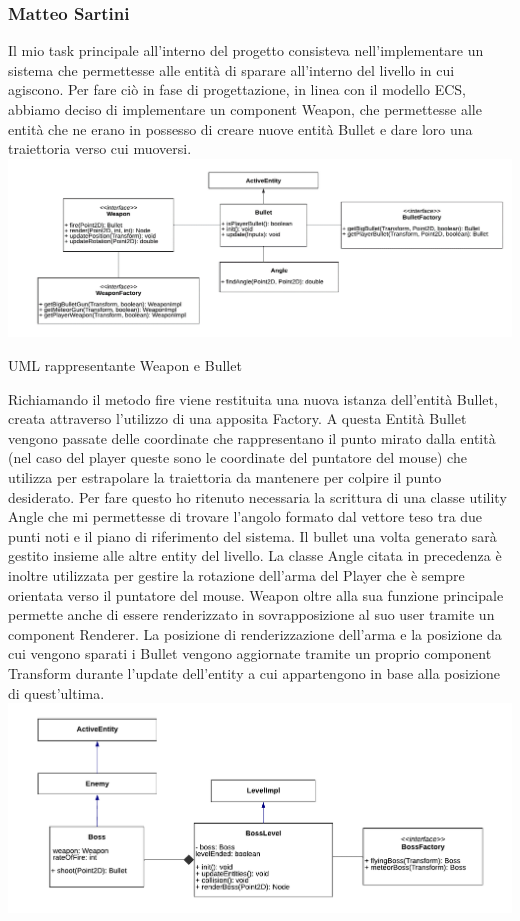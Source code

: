\documentclass{article}
\begin{document}
\subsubsection{Matteo Sartini}
Il mio task principale all’interno del progetto consisteva nell’implementare un sistema che permettesse alle entità di sparare all’interno del livello in cui agiscono.
Per fare ciò in fase di progettazione, in linea con il modello ECS, abbiamo deciso di implementare un component Weapon, che permettesse alle entità che ne erano in possesso di creare nuove entità Bullet e dare loro una traiettoria verso cui muoversi.
\includegraphics[width=1\textwidth]{UMLWeapon.png}
    \caption{UML rappresentante Weapon e Bullet}
    \label{fig:schgen}
Richiamando il metodo fire viene restituita una nuova istanza dell’entità Bullet, creata attraverso l’utilizzo di una apposita Factory. A questa Entità Bullet vengono passate delle coordinate che rappresentano il punto mirato dalla entità (nel caso del player queste sono le coordinate del puntatore del mouse) che utilizza per estrapolare la traiettoria da mantenere per colpire il punto desiderato. Per fare questo ho ritenuto necessaria la scrittura di una classe utility Angle che mi permettesse di trovare l’angolo formato dal vettore teso tra due punti noti e il piano di riferimento del sistema. Il bullet una volta generato sarà gestito insieme alle altre entity del livello.
La classe Angle citata in precedenza è inoltre utilizzata per gestire la rotazione dell’arma del Player che è sempre orientata verso il puntatore del mouse.
Weapon oltre alla sua funzione principale permette anche di essere renderizzato in sovrapposizione al suo user tramite un component Renderer. La posizione di renderizzazione dell’arma e la posizione da cui vengono sparati i Bullet vengono aggiornate tramite un proprio component Transform durante l’update dell’entity a cui appartengono in base alla posizione di quest’ultima.
\includegraphics[width=1\textwidth]{UMLBoss.png}
\end{document}
